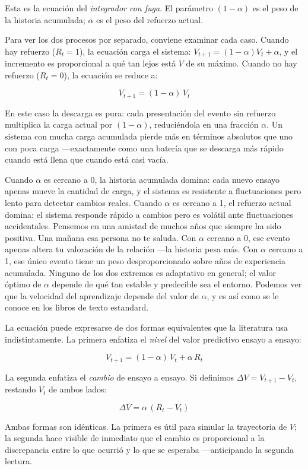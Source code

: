 \documentclass[
  letterpaper,
  DIV=11,
  numbers=noendperiod]{scrreprt}
\begin{document}
\begin{tcolorbox}[enhanced jigsaw, arc=.35mm, bottomrule=.15mm, breakable, colback=white, colframe=quarto-callout-note-color-frame, left=2mm, leftrule=.75mm, opacityback=0, rightrule=.15mm, toprule=.15mm]
Esta es la ecuación del \emph{integrador con fuga}. El parámetro
\((1-\alpha)\) es el peso de la historia acumulada; \(\alpha\) es el
peso del refuerzo actual.

Para ver los dos procesos por separado, conviene examinar cada caso.
Cuando hay refuerzo (\(R_t = 1\)), la ecuación carga el sistema:
\(V_{t+1} = (1-\alpha)V_t + \alpha\), y el incremento es proporcional a
qué tan lejos está \(V\) de su máximo. Cuando no hay refuerzo
(\(R_t = 0\)), la ecuación se reduce a:

\[V_{t+1} = (1-\alpha)\,V_t\]

En este caso la descarga es pura: cada presentación del evento sin
refuerzo multiplica la carga actual por \((1-\alpha)\), reduciéndola en
una fracción \(\alpha\). Un sistema con mucha carga acumulada pierde más
en términos absolutos que uno con poca carga ---exactamente como una
batería que se descarga más rápido cuando está llena que cuando está
casi vacía.

Cuando \(\alpha\) es cercano a 0, la historia acumulada domina: cada
nuevo ensayo apenas mueve la cantidad de carga, y el sistema es
resistente a fluctuaciones pero lento para detectar cambios reales.
Cuando \(\alpha\) es cercano a 1, el refuerzo actual domina: el sistema
responde rápido a cambios pero es volátil ante fluctuaciones
accidentales. Pensemos en una amistad de muchos años que siempre ha sido
positiva. Una mañana esa persona no te saluda. Con \(\alpha\) cercano a
0, ese evento apenas altera tu valoración de la relación ---la historia
pesa más. Con \(\alpha\) cercano a 1, ese único evento tiene un peso
desproporcionado sobre años de experiencia acumulada. Ninguno de los dos
extremos es adaptativo en general; el valor óptimo de \(\alpha\) depende
de qué tan estable y predecible sea el entorno. Podemos ver que la
velocidad del aprendizaje depende del valor de \(\alpha\), y es así como
se le conoce en los libros de texto estandard.

La ecuación puede expresarse de dos formas equivalentes que la
literatura usa indistintamente. La primera enfatiza el \emph{nivel} del
valor predictivo ensayo a ensayo:

\[V_{t+1} = (1-\alpha)\,V_t + \alpha\,R_t\]

La segunda enfatiza el \emph{cambio} de ensayo a ensayo. Si definimos
\(\Delta V = V_{t+1} - V_t\), restando \(V_t\) de ambos lados:

\[\Delta V = \alpha\,(R_t - V_t)\]

Ambas formas son idénticas. La primera es útil para simular la
trayectoria de \(V\); la segunda hace visible de inmediato que el cambio
es proporcional a la discrepancia entre lo que ocurrió y lo que se
esperaba ---anticipando la segunda lectura.


\end{tcolorbox}
\end{document}
